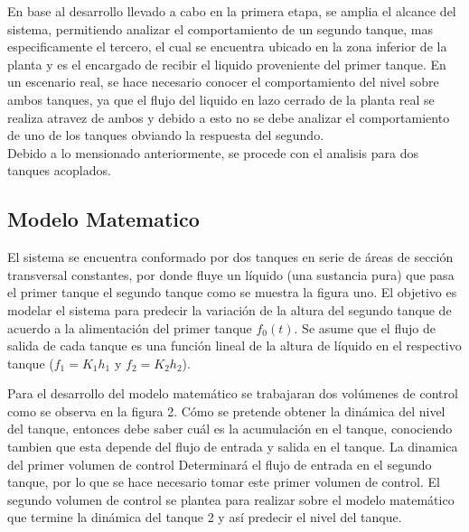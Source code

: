 \documentclass[a4paper,12pt,twoside]{proyectotanquesecci}
\begin{document}
En base al desarrollo llevado a cabo en la primera etapa, se amplia el alcance del sistema, permitiendo analizar el comportamiento de un segundo tanque, mas especificamente el tercero, el cual se encuentra ubicado en la zona inferior de la planta y es el encargado de recibir el liquido proveniente del primer tanque. En un escenario real, se hace necesario conocer el comportamiento del nivel sobre ambos tanques, ya que el flujo del liquido en lazo cerrado de la planta real se realiza atravez de ambos y debido a esto no se debe analizar el comportamiento de uno de los tanques obviando la respuesta del segundo. \\

Debido a lo mensionado anteriormente, se procede con el analisis para dos tanques acoplados.

\subsection{Modelo Matematico}

El sistema se encuentra conformado por dos tanques en serie de áreas de sección transversal constantes, por donde fluye un líquido (una sustancia pura) que pasa el primer tanque el segundo tanque como se muestra la figura uno. El objetivo es modelar el sistema para predecir la variación de la altura del segundo tanque de acuerdo a la alimentación del primer tanque $f_{0}(t)$. Se asume que el flujo de salida de cada tanque es una función lineal de la altura de líquido en el respectivo tanque ($f_{1}=K_{1}h_{1}$ y $f_{2}=K_{2}h_{2}$).


Para el desarrollo del modelo matemático se trabajaran dos volúmenes de control como se observa en la figura 2. Cómo se pretende obtener la dinámica del nivel del tanque, entonces debe saber cuál es la acumulación en el tanque, conociendo tambien que esta depende del flujo de entrada y salida en el tanque. La dinamica del primer volumen de control Determinará el flujo de entrada en el segundo tanque, por lo que se hace necesario tomar este primer volumen de control. El segundo volumen de control se plantea para realizar sobre el modelo matemático que termine la dinámica del tanque 2 y así predecir el nivel del tanque.
\end{document}
